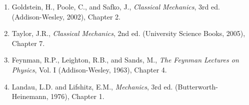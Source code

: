 \begin{enumerate}
\item Goldstein, H., Poole, C., and Safko, J., \textit{Classical Mechanics}, 3rd ed. (Addison-Wesley, 2002), Chapter 2.
\item Taylor, J.R., \textit{Classical Mechanics}, 2nd ed. (University Science Books, 2005), Chapter 7.
\item Feynman, R.P., Leighton, R.B., and Sands, M., \textit{The Feynman Lectures on Physics}, Vol. I (Addison-Wesley, 1963), Chapter 4.
\item Landau, L.D. and Lifshitz, E.M., \textit{Mechanics}, 3rd ed. (Butterworth-Heinemann, 1976), Chapter 1.
\end{enumerate}


